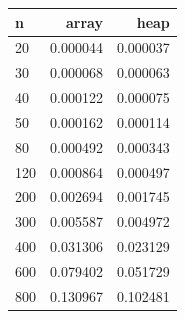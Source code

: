 \begin{tabular}{lrr}
\hline
n & array & heap \\
\hline
20 & 0.000044 & 0.000037 \\
30 & 0.000068 & 0.000063 \\
40 & 0.000122 & 0.000075 \\
50 & 0.000162 & 0.000114 \\
80 & 0.000492 & 0.000343 \\
120 & 0.000864 & 0.000497 \\
200 & 0.002694 & 0.001745 \\
300 & 0.005587 & 0.004972 \\
400 & 0.031306 & 0.023129 \\
600 & 0.079402 & 0.051729 \\
800 & 0.130967 & 0.102481 \\
\hline
\end{tabular}
